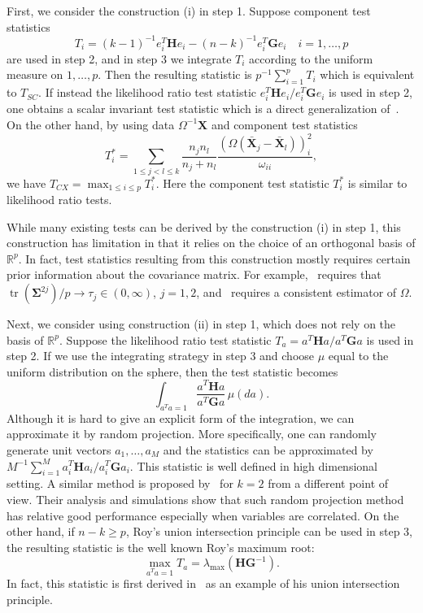 \documentclass[12pt]{article} %
\DeclareMathOperator{\mytr}{tr}
\newcommand{\bX}{\mathbf{X}}
\newcommand{\bH}{\mathbf{H}}
\newcommand{\bG}{\mathbf{G}}
\newcommand{\bfsym}[1]{\ensuremath{\boldsymbol{#1}}}
\def\bSigma {\bfsym {\Sigma}}
\theoremstyle{definition}
\begin{document}
First, we consider the construction (i) in step 1.
Suppose component test statistics 
$$T_i={(k-1)^{-1}} e_i^T \bH e_i-(n-k)^{-1}e_i^T \bG e_i\quad i=1,\ldots, p$$
are used in step 2, and in step 3 we integrate $T_i$ according to the uniform measure on $1,\ldots,p$. Then the resulting statistic is $p^{-1}\sum_{i=1}^p T_i$ which is equivalent to $T_{SC}$.
If instead the likelihood ratio test statistic $e_i^T \bH e_i/e_i^T \bG e_i$ is used in step 2, one obtains a scalar invariant test statistic which is a direct generalization of~\citet{Srivastava2009A}.
On the other hand, by using data $\Omega^{-1}\bX$ and component test statistics
$$
T_i^*=\sum_{1\leq j<l \leq k} \frac{n_j n_l}{n_j+n_l}\frac{(\Omega(\bar{\bX}_j-\bar{\bX}_l))^2_i}{\omega_{ii}},
$$
we have $T_{CX}=\max_{1\leq i\leq p}T_i^*$.
Here the component test statistic $T_i^*$ is similar to likelihood ratio tests.

While many existing tests can be derived by the construction (i) in step 1, this construction has limitation in that it relies on the choice of an orthogonal basis of $\mathbb{R}^p$.
In fact, test statistics resulting from this construction mostly requires certain prior information about the covariance matrix.
For example,~\citet{Schott2007Some} requires that $\mytr(\bSigma^{2j})/p\to \tau_j\in(0,\infty)$, $j=1,2$, and~\citet{Cai2014High} requires a consistent estimator of $\Omega$.

Next, we consider using construction (ii) in step 1, which does not rely on the basis of $\mathbb{R}^p$.
Suppose the likelihood ratio test statistic $T_a=a^T \bH a/a^T \bG a$ is used in step 2.
If we use the integrating strategy in step 3 and choose $\mu$ equal to the uniform distribution on the sphere, then the test statistic becomes
$$
\int_{a^T a=1} \frac{a^T \bH a}{a^T \bG a}\, \mu(da).
$$
Although it is hard to give an explicit form of the integration, we can approximate it by random projection.
More specifically, one can randomly generate unit vectors $a_1,\ldots,a_M$ and the statistics can be approximated by $M^{-1}\sum_{i=1}^M a_i^T \bH a_i/a_i^T \bG a_i$.
This statistic is well defined in high dimensional setting.
A similar method is proposed by~\cite{Lopes2015A} for $k=2$ from a different point of view.
Their analysis and simulations show that such random projection method has relative good performance especially when variables are correlated.
On the other hand, if $n-k\geq p$, Roy's union intersection principle can be used in step 3, the resulting  statistic is the  well known Roy's maximum root:
$$
\max_{a^T a=1}T_a=\lambda_{\max}(\bH \bG^{-1}).
$$
In fact, this statistic is first derived in~\cite{Roy1953} as an example of his union intersection principle.
\end{document}
